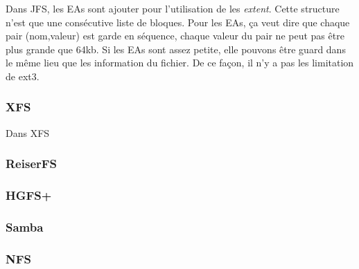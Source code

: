 Dans JFS, les EAs sont ajouter pour l'utilisation de les \emph{extent}. Cette structure n'est que une consécutive liste de bloques. Pour les EAs, ça veut dire que chaque pair (nom,valeur) est garde en séquence, chaque valeur du pair ne peut pas être plus grande que 64kb. Si les EAs sont assez petite, elle pouvons être guard dans le même lieu que les information du fichier. De ce façon, il n'y a pas les limitation de ext3.

\subsubsection*{XFS}

Dans XFS

\subsubsection*{ReiserFS}
\subsubsection*{HGFS+}
\subsubsection*{Samba}
\subsubsection*{NFS}
